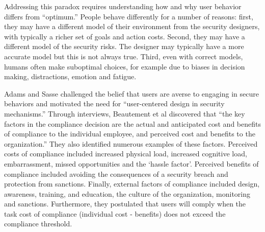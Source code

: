 \documentclass{acm_proc_article-sp}
\begin{document}
Addressing this paradox requires understanding how and why user behavior
differs from ``optimum.''
People behave differently for a number of reasons:
first, they may have a
different model of their environment from the security designers, with
typically a richer set of goals and action costs.
Second, they may have a
different model of the security risks. The designer may typically have
a more accurate model but this is not always true.
Third, even with
correct models, humans often make suboptimal choices, for example due
to biases in decision making, distractions, emotion and fatigue.


Adams and Sasse 
\cite{adams1999users} challenged the belief that users 
are averse to engaging in secure behaviors and motivated the need for 
``user-centered design in security mechanisms.'' 
Through interviews, Beautement et al  \cite{beautement2009compliance} discovered that ``the key factors in 
the compliance decision are the actual and anticipated cost and benefits of 
compliance to the individual employee, and perceived cost and benefits to 
the organization.'' They also identified numerous examples of these
factors.
Perceived costs of compliance included increased physical load,
increased cognitive load, embarrassment, missed opportunities and the `hassle factor'.
Perceived benefits of compliance included avoiding the consequences of
a security breach and protection from sanctions.
Finally, external factors of compliance included design, awareness,
training, and education, the culture of the organization, monitoring and sanctions.
Furthermore, they postulated that users will comply when the task cost of 
compliance (individual cost - benefits) does not exceed the compliance threshold.
\end{document}
